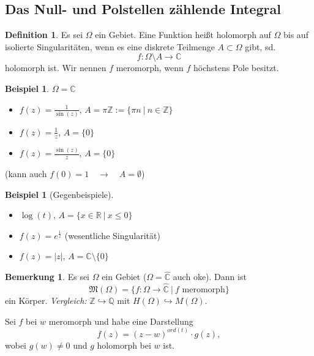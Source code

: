 \documentclass[11pt,titlepage]{article}
\theoremstyle{definition}
\newtheorem{definition}[theorem]{Definition}
\newtheorem{example}[theorem]{Beispiel}
\newtheorem{remark}[theorem]{Bemerkung}
\theoremstyle{remark}
\begin{document}
	\subsection{Das Null- und Polstellen zählende Integral}
	
	\begin{definition}
		Es sei $\Omega$ ein Gebiet. Eine Funktion heißt holomorph auf $\Omega$ bis auf isolierte 
		Singularitäten, wenn es eine diskrete Teilmenge $A\subset\Omega$ gibt, sd.
		\[ f:\Omega\setminus A\to\mathbb{C}\]
		holomorph ist. Wir nennen $f$ meromorph, wenn $f$ höchstens Pole besitzt.
	\end{definition}
	
	\begin{example}
		$\Omega =\mathbb{C}$
		\begin{itemize}
			\item $f(z)=\frac{1}{\sin(z)}$, $A=\pi\mathbb{Z}:=\{\pi n\ \vert\ n\in\mathbb{Z}\}$
			
			\item $f(z)=\frac{1}{z}$, $A=\{0\}$
			
			\item $f(z)=\frac{\sin(z)}{z}$, $A=\{0\}$
		\end{itemize}
		(kann auch $f(0)=1\quad\to\quad A=\emptyset$)
	\end{example}
	
	\begin{example}[Gegenbeispiele]
		\begin{itemize}
			\item $\log(t)$, $A=\{ x\in\mathbb{R}\ \vert\ x\leq 0\}$
			
			\item $f(z)=e^{\frac{1}{z}}$ (wesentliche Singularität)
			
			\item $f(z)=|z|$, $A=\mathbb{C}\setminus\{0\}$
		\end{itemize}
	\end{example}
	
	\begin{remark}
		Es sei $\Omega$ ein Gebiet ($\Omega =\hat{\mathbb{C}}$ auch oke). Dann ist 
		\[ \mathfrak{M}(\Omega)=\{f:\Omega\to\hat{\mathbb{C}}\ \vert\  f\text{ meromorph}\} \]
		ein Körper. \textsl{Vergleich:} $\mathbb{Z}\hookrightarrow \mathbb{Q}$ mit $H(\Omega)
		\hookrightarrow M(\Omega)$.
	\end{remark}
	
	Sei $f$ bei $w$ meromorph und habe eine Darstellung 
	\[ f(z)=(z-w)^{ord(t)}\cdot g(z),\]
	wobei $g(w)\neq 0$ und $g$ holomorph bei $w$ ist.
	
\end{document}
